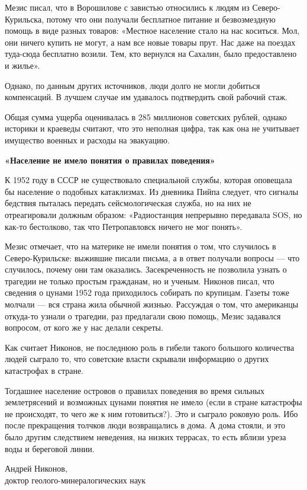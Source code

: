 Мезис писал, что в Ворошилове с завистью относились к людям из Северо-Курильска, потому что они получали бесплатное питание и безвозмездную помощь в виде разных товаров: «Местное население стало на нас коситься. Мол, они ничего купить не могут, а нам все новые товары прут. Нас даже на поездах туда-сюда бесплатно возили. Тем, кто вернулся на Сахалин, было предоставлено и жилье».

Однако, по данным других источников, люди долго не могли добиться компенсаций. В лучшем случае им удавалось подтвердить свой рабочий стаж.

Общая сумма ущерба оценивалась в 285 миллионов советских рублей, однако историки и краеведы считают, что это неполная цифра, так как она не учитывает имущество военных и расходы на эвакуацию.

\textbf{«Население не имело понятия о правилах поведения»}

К 1952 году в СССР не существовало специальной службы, которая оповещала бы население о подобных катаклизмах. Из дневника Пийпа следует, что сигналы бедствия пыталась передать сейсмологическая служба, но на них не отреагировали должным образом: «Радиостанция непрерывно передавала SOS, но как-то бестолково, так что Петропавловск ничего не мог понять».

Мезис отмечает, что на материке не имели понятия о том, что случилось в Северо-Курильске: выжившие писали письма, а в ответ получали вопросы --- что случилось, почему они там оказались. Засекреченность не позволила узнать о трагедии не только простым гражданам, но и ученым. Никонов писал, что сведения о цунами 1952 года приходилось собирать по крупицам. Газеты тоже молчали --- вся страна жила обычной жизнью. Рассуждая о том, что американцы откуда-то узнали о трагедии, раз предлагали свою помощь, Мезис задавался вопросом, от кого же у нас делали секреты.

Как считает Никонов, не последнюю роль в гибели такого большого количества людей сыграло то, что советские власти скрывали информацию о других катастрофах в стране.

\begin{fancyquotes}
    Тогдашнее население островов о правилах поведения во время сильных землетрясений и возможных цунами понятия не имело (если в стране катастрофы не происходят, то чего же к ним готовиться?). Это и сыграло роковую роль. Ибо после прекращения толчков люди возвращались в дома. А дома стояли, и это было другим следствием неведения, на низких террасах, то есть вблизи уреза воды и береговой линии.

    \begin{flushright}
        Андрей Никонов,
        \\
        доктор геолого-минералогических наук
    \end{flushright}
\end{fancyquotes}

